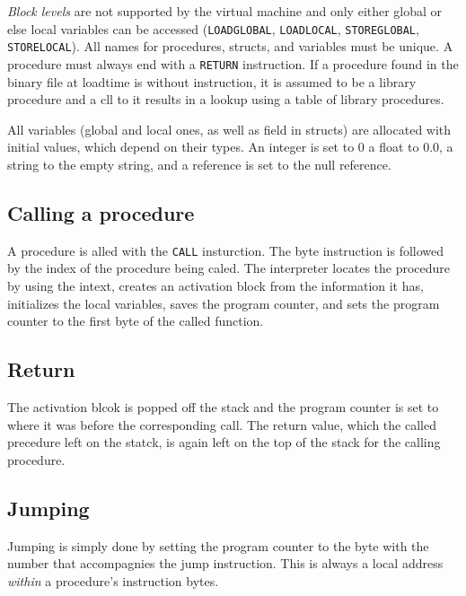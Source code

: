 \documentclass[11pt]{article}
\begin{document}

\emph{Block levels} are not supported by the virtual machine and only either
global or else local variables can be accessed (\texttt{LOADGLOBAL}, \texttt{LOADLOCAL},
\texttt{STOREGLOBAL}, \texttt{STORELOCAL}). All names for procedures, structs, and
variables must be unique. A procedure must always end with a \texttt{RETURN}
instruction. If a procedure found in the binary file at loadtime is without
instruction, it is assumed to be a library procedure and a cll to it
results in a lookup using a table of library procedures.

All variables (global and local ones, as well as field in structs) are
allocated with initial values, which depend on their types. An integer is
set to \(0\) a float to \(0.0\), a string to the empty string, and a reference
is set to the null reference.

\subsection{Calling a procedure}
\label{sec:orge57a95a}

A procedure is alled with the \texttt{CALL} insturction. The byte instruction is
followed by the index of the procedure being caled. The interpreter locates
the procedure by using the intext, creates an activation block from the
information it has, initializes the local variables, saves the program
counter, and sets the program counter to the first byte of the called
function.

\subsection{Return}
\label{sec:org92034a5}
The activation blcok is popped off the stack and the program counter is set
to where it was before the corresponding call. The return value, which the
called precedure left on the statck, is again left on the top of the stack
for the calling procedure.


\subsection{Jumping}
\label{sec:org408b4e4}


Jumping is simply done by setting the program counter to the byte with the
number that accompagnies the jump instruction. This is always a local
address \emph{within} a procedure's instruction bytes.
\end{document}
